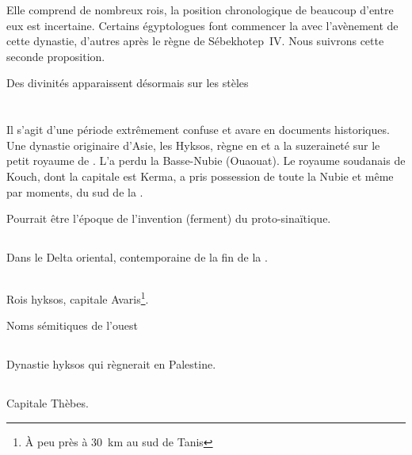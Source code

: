 Elle comprend de nombreux rois, la position chronologique de beaucoup 
d'entre eux est incertaine. Certains égyptologues font commencer la 
\DPI avec l'avènement de cette dynastie, d'autres après le règne de 
Sébekhotep~IV. Nous suivrons cette seconde proposition.

Des divinités apparaissent désormais sur les stèles

\section{\DPI}

Il s'agit d'une période extrêmement confuse et avare en documents 
historiques. Une dynastie originaire d'Asie, les Hyksos, règne en 
\BE et a la suzeraineté sur le petit royaume de \HE. L'\kmt a perdu la
Basse-Nubie (Ouaouat). Le royaume soudanais de Kouch, dont la capitale 
est Kerma, a pris possession de toute la Nubie et même par moments, 
du sud de la \HE.

Pourrait être l'époque de l'invention (ferment) du proto-sinaïtique.


\subsection{\texorpdfstring{}{XIVe dynastie}}

Dans le Delta oriental, contemporaine de la fin de la .

\subsection{\texorpdfstring{}{XVe dynastie}}

Rois hyksos, capitale Avaris\footnote{À peu près à 
\SI{30}{\kilo\meter} au sud de Tanis}.

Noms sémitiques de l'ouest

\subsection{\texorpdfstring{}{XVIe dynastie}}

Dynastie hyksos qui règnerait en Palestine.

\subsection{\texorpdfstring{}{XVIIe dynastie}}

Capitale Thèbes.

